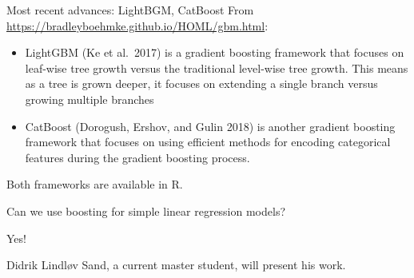 \documentclass[
  10pt,
  ignorenonframetext,
]{beamer}
\begin{document}
\begin{frame}{Most recent advances: LightBGM, CatBoost}
\protect\hypertarget{most-recent-advances-lightbgm-catboost}{}
From \url{https://bradleyboehmke.github.io/HOML/gbm.html}:

\begin{itemize}
\item
  LightGBM (Ke et al.~2017) is a gradient boosting framework that
  focuses on leaf-wise tree growth versus the traditional level-wise
  tree growth. This means as a tree is grown deeper, it focuses on
  extending a single branch versus growing multiple branches
\item
  CatBoost (Dorogush, Ershov, and Gulin 2018) is another gradient
  boosting framework that focuses on using efficient methods for
  encoding categorical features during the gradient boosting process.
\end{itemize}

Both frameworks are available in R.
\end{frame}

\begin{frame}{Can we use boosting for simple linear regression models?}
\protect\hypertarget{can-we-use-boosting-for-simple-linear-regression-models}{}
\(~\)

Yes!

Didrik Lindløv Sand, a current master student, will present his work.
\end{frame}
\end{document}

